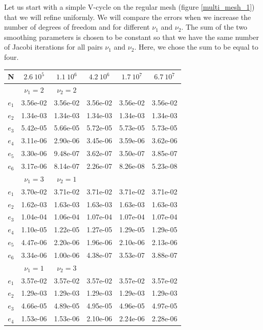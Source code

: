 Let us start with a simple V-cycle on the regular mesh (figure \ref{multi_mesh_1}) that we will refine uniformly. We will compare the errors when we increase the number of degrees of freedom and for different $\nu_1$ and $\nu_2$. The sum of the two smoothing parameters is chosen to be constant so that we have the same number of Jacobi iterations for all pairs $\nu_1$ and $\nu_2$. Here, we chose the sum to be equal to four.


\begin{table}
\centering
\begin{tabular}{c|ccccc}
\hline
 N & $2.6\:10^5$ & $1.1\:10^6$ & $4.2\: 10^6$& $1.7\:10^7$ & $6.7\:10^7$ \\
 \hline
  & $\nu_1=2$ & $\nu_2=2$ & & &\\
  \hline
  $e_1$ & 3.56e-02 & 3.56e-02 & 3.56e-02 & 3.56e-02 & 3.56e-02\\
  $e_2$ & 1.34e-03 &	1.34e-03 &	1.34e-03	& 1.34e-03	& 1.34e-03\\
  $e_3$ & 5.42e-05 &	5.66e-05 &	5.72e-05 &	5.73e-05 &	5.73e-05\\
  $e_4$ & 3.11e-06 &	2.90e-06 &	3.45e-06 &	3.59e-06 &	3.62e-06\\
  $e_5$ & 3.30e-06 &	9.48e-07 &	3.62e-07	& 3.50e-07 &	3.85e-07\\
  $e_6$ & 3.17e-06 &	8.14e-07 &	2.26e-07 &	8.26e-08 &	5.23e-08\\
  \hline
  & $\nu_1=3$ & $\nu_2=1$ & & &\\
  \hline
  $e_1$ & 3.70e-02 &	3.71e-02 &	3.71e-02 &	3.71e-02 &	3.71e-02\\
  $e_2$ & 1.62e-03 &	1.63e-03 &	1.63e-03 &	1.63e-03 &	1.63e-03\\
  $e_3$ & 1.04e-04 &	1.06e-04 &	1.07e-04 &	1.07e-04	& 1.07e-04\\
  $e_4$ & 1.10e-05 &	1.22e-05 &	1.27e-05 &	1.29e-05 & 	1.29e-05\\
  $e_5$ & 4.47e-06 &	2.20e-06 &	1.96e-06 &	2.10e-06 & 	2.13e-06\\
  $e_6$ & 3.34e-06 &	1.00e-06 &	4.38e-07 &	3.53e-07 &	3.88e-07\\
  \hline
  & $\nu_1=1$ & $\nu_2=3$ & & &\\
  \hline
  $e_1$ & 3.57e-02 &	3.57e-02 &	3.57e-02 &	3.57e-02 &	3.57e-02\\
  $e_2$ & 1.29e-03 &	1.29e-03 &	1.29e-03 &	1.29e-03 &	1.29e-03\\
  $e_3$ & 4.66e-05 &	4.89e-05 &	4.95e-05 &	4.96e-05 &	4.97e-05\\
  $e_4$ & 1.53e-06 &	1.53e-06 &	2.10e-06 &	2.24e-06 &	2.28e-06\\

\end{tabular}
\end{table}
